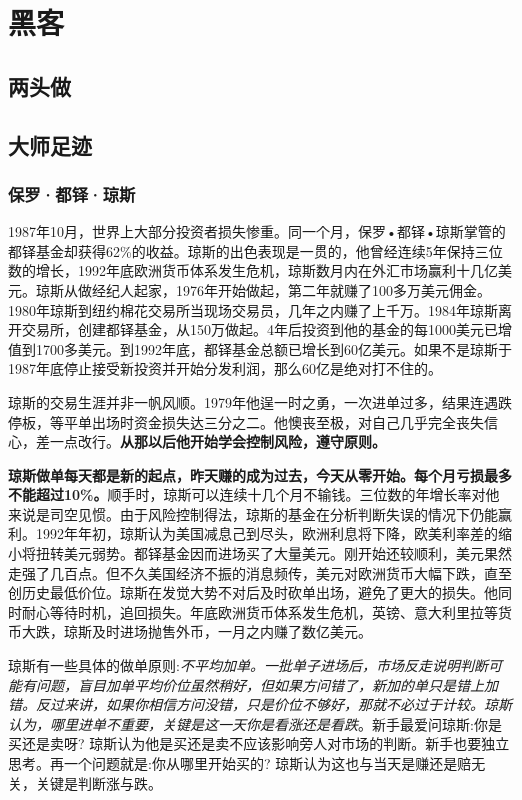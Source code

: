\section{黑客}

\subsection{两头做}





\subsection{大师足迹}


\subsubsection{保罗·都铎·琼斯}

1987年10月，世界上大部分投资者损失惨重。同一个月，保罗•都铎•琼斯掌管的都铎基金却获得62\%的收益。琼斯的出色表现是一贯的，他曾经连续5年保持三位数的增长，1992年底欧洲货币体系发生危机，琼斯数月内在外汇市场赢利十几亿美元。琼斯从做经纪人起家，1976年开始做起，第二年就赚了100多万美元佣金。1980年琼斯到纽约棉花交易所当现场交易员，几年之内赚了上千万。1984年琼斯离开交易所，创建都铎基金，从150万做起。4年后投资到他的基金的每1000美元已增值到1700多美元。到1992年底，都铎基金总额已增长到60亿美元。如果不是琼斯于1987年底停止接受新投资并开始分发利润，那么60亿是绝对打不住的。


琼斯的交易生涯并非一帆风顺。1979年他逞一时之勇，一次进单过多，结果连遇跌停板，等平单出场时资金损失达三分之二。他懊丧至极，对自己几乎完全丧失信心，差一点改行。\textbf{从那以后他开始学会控制风险，遵守原则。}


\textbf{琼斯做单每天都是新的起点，昨天赚的成为过去，今天从零开始。每个月亏损最多不能超过10\%。}顺手时，琼斯可以连续十几个月不输钱。三位数的年增长率对他来说是司空见惯。由于风险控制得法，琼斯的基金在分析判断失误的情况下仍能赢利。1992年年初，琼斯认为美国减息己到尽头，欧洲利息将下降，欧美利率差的缩小将扭转美元弱势。都铎基金因而进场买了大量美元。刚开始还较顺利，美元果然走强了几百点。但不久美国经济不振的消息频传，美元对欧洲货币大幅下跌，直至创历史最低价位。琼斯在发觉大势不对后及时砍单出场，避免了更大的损失。他同时耐心等待时机，追回损失。年底欧洲货币体系发生危机，英镑、意大利里拉等货币大跌，琼斯及时进场抛售外币，一月之内赚了数亿美元。

琼斯有一些具体的做单原则:\textit{不平均加单。一批单子进场后，市场反走说明判断可能有问题，盲目加单平均价位虽然稍好，但如果方问错了，新加的单只是错上加错。反过来讲，如果你相信方问没错，只是价位不够好，那就不必过于计较。琼斯认为，哪里进单不重要，关键是这一天你是看涨还是看跌}。新手最爱问琼斯:你是买还是卖呀? 琼斯认为他是买还是卖不应该影响旁人对市场的判断。新手也要独立思考。再一个问题就是:你从哪里开始买的? 琼斯认为这也与当天是赚还是赔无关，关键是判断涨与跌。

